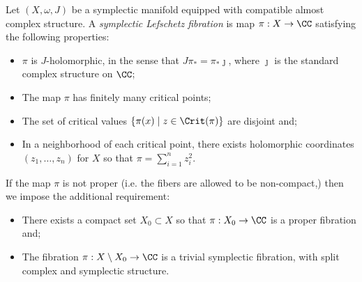 
\begin{definition}
    Let $(X, \omega , J)$ be a symplectic manifold equipped with compatible almost complex structure.
    A \emph{symplectic Lefschetz fibration} is map $\pi: X\to \CC$ satisfying the following properties:
    \begin{itemize}
        \item $\pi$ is $J$-holomorphic, in the sense that $J\pi_*=\pi_*\jmath$, where $\jmath$ is the standard complex structure on $\CC$;
        \item The map $\pi$ has finitely many critical points;
        \item The set of critical values $\{\pi(x)\;|\;z\in \Crit(\pi)\}$ are disjoint and;
        \item In a neighborhood of each critical point, there exists holomorphic coordinates $(z_1, \ldots, z_n)$ for $X$ so that $\pi=\sum_{i=1}^n z_i^2$. 
    \end{itemize}
    If the map $\pi$ is not proper (i.e. the fibers are allowed to be non-compact,) then we impose the additional requirement:
    \begin{itemize}
        \item There exists a compact set $X_0\subset X$ so that $\pi:X_0\to \CC$ is a proper fibration and;
        \item The fibration $\pi:X\setminus X_0\to \CC$ is a trivial symplectic fibration, with split complex and symplectic structure. 
    \end{itemize}
\end{definition}